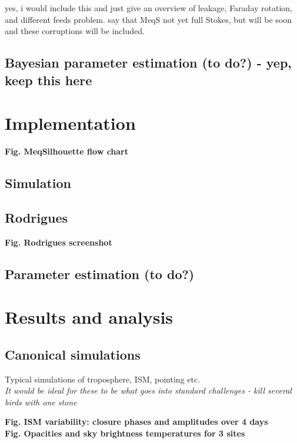 \documentclass{article}
\begin{document}
yes, i would include this and just give an overview of leakage, Faraday rotation,  and different feeds problem. say that MeqS not yet full Stokes, but will be soon and these corruptions will be included. 


\subsection{Bayesian parameter estimation (to do?) - yep, keep this here }


\section{Implementation}

{\bf Fig. MeqSilhouette flow chart}
\subsection{Simulation}

\subsection{Rodrigues}
{\bf Fig. Rodrigues screenshot}

\subsection{Parameter estimation (to do?)}



\section{Results and analysis}

\subsection{Canonical simulations}

Typical simulations of troposphere, ISM, pointing etc.\\

{\it It would be ideal for these to be what goes into standard challenges - kill several birds with one stone}

{\bf Fig. ISM variability: closure phases and amplitudes over 4 days}\\

{\bf Fig. Opacities and sky brightness temperatures for 3 sites}\\
\end{document}
